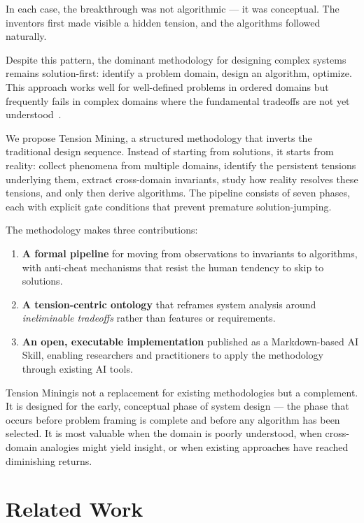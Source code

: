 \documentclass[11pt,a4paper]{article}
\newcommand{\methodname}{Tension Mining}
\begin{document}
In each case, the breakthrough was not algorithmic --- it was conceptual. The inventors first made visible a hidden tension, and the algorithms followed naturally.

Despite this pattern, the dominant methodology for designing complex systems remains solution-first: identify a problem domain, design an algorithm, optimize. This approach works well for well-defined problems in ordered domains but frequently fails in complex domains where the fundamental tradeoffs are not yet understood~\cite{snowden2007leader}.

We propose \methodname, a structured methodology that inverts the traditional design sequence. Instead of starting from solutions, it starts from reality: collect phenomena from multiple domains, identify the persistent tensions underlying them, extract cross-domain invariants, study how reality resolves these tensions, and only then derive algorithms. The pipeline consists of seven phases, each with explicit gate conditions that prevent premature solution-jumping.

The methodology makes three contributions:

\begin{enumerate}
  \item \textbf{A formal pipeline} for moving from observations to invariants to algorithms, with anti-cheat mechanisms that resist the human tendency to skip to solutions.
  \item \textbf{A tension-centric ontology} that reframes system analysis around \emph{ineliminable tradeoffs} rather than features or requirements.
  \item \textbf{An open, executable implementation} published as a Markdown-based AI Skill, enabling researchers and practitioners to apply the methodology through existing AI tools.
\end{enumerate}

\methodname is not a replacement for existing methodologies but a complement. It is designed for the early, conceptual phase of system design --- the phase that occurs before problem framing is complete and before any algorithm has been selected. It is most valuable when the domain is poorly understood, when cross-domain analogies might yield insight, or when existing approaches have reached diminishing returns.

\section{Related Work}
\label{sec:related}
\end{document}
